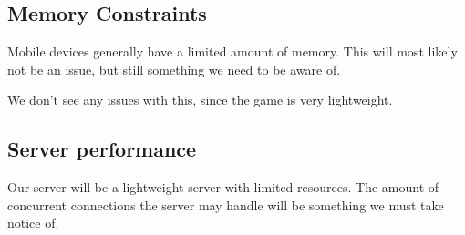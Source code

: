 \subsection{Memory Constraints}
Mobile devices generally have a limited amount of memory. This will most likely
not be an issue, but still something we need to be aware of.

We don't see any issues with this, since the game is very lightweight.

\subsection{Server performance}
Our server will be a lightweight server with limited resources. The amount of
concurrent connections the server may handle will be something we must take
notice of.
